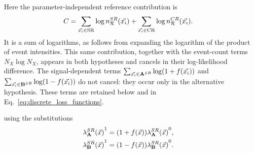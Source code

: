 \documentclass[paper/ddppaper2.tex]{subfiles}
\begin{document}
\noindent Here the parameter-independent reference contribution is
\begin{equation}
    C = \sum_{\event\in\mathrm{SR}}\log \srrefdist[\event]
      + \sum_{\event\in\mathrm{CR}}\log \crrefdist[\event].
\end{equation}
It is a sum of logarithms, as follows from expanding the logarithm of
 the product of event intensities. This same contribution, together with
 the event-count terms $N_X\log N_X$, appears in both hypotheses and
 cancels in their log-likelihood difference. The signal-dependent terms
 $\sum_{\event\in\srdataset{A}}\log(1+f(\event))$ and
 $\sum_{\event\in\srdataset{B}}\log(1-f(\event))$ do not cancel:
 they occur only in the alternative hypothesis. These terms are retained below and in
 Eq.~\ref{eq:discrete_loss_functions}.

\noindent using the substitutions
\begin{equation*}
\begin{aligned}
\srdist{\dataset{A}}^1 = (1 + f(\anyevent))\srdist{\dataset{A}}^0, \\
\srdist{\dataset{B}}^1 = (1 - f(\anyevent))\srdist{\dataset{B}}^0.
\end{aligned}
\end{equation*}
\end{document}
